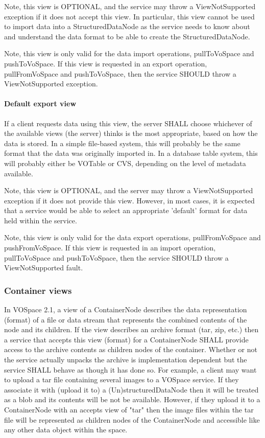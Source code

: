 \documentclass[11pt,a4paper]{ivoa}
\begin{document}
Note, this view is OPTIONAL, and the service may throw a ViewNotSupported exception if it does not accept this view. In particular, this view cannot be used to import data into a StructuredDataNode as the service needs to know about and understand the data format to be able to create the StructuredDataNode.

Note, this view is only valid for the data import operations, pullToVoSpace and pushToVoSpace. If this view is requested in an export operation, pullFromVoSpace and pushToVoSpace, then the service SHOULD throw a ViewNotSupported exception.

\paragraph{Default export view}
If a client requests data using this view, the server SHALL choose whichever of the available views (the server) thinks is the most appropriate, based on how the data is stored. In a simple file-based system, this will probably be the same format that the data was originally imported in. In a database table system, this will probably either be VOTable or CVS, depending on the level of metadata available.

Note, this view is OPTIONAL, and the server may throw a ViewNotSupported exception if it does not provide this view. However, in most cases, it is expected that a service would be able to select an appropriate 'default' format for data held within the service.

Note, this view is only valid for the data export operations, pullFromVoSpace and pushFromVoSpace. If this view is requested in an import operation, pullToVoSpace and pushToVoSpace, then the service SHOULD throw a ViewNotSupported fault.

\subsubsection{Container views}
In VOSpace 2.1, a view of a ContainerNode describes the data representation (format) of a file or data stream that represents the combined contents of the node and its children. If the view describes an archive format (tar, zip, etc.) then a service that accepts this view (format) for a ContainerNode SHALL provide access to the archive contents as children nodes of the container. Whether or not the service actually unpacks the archive is implementation dependent but the service SHALL behave as though it has done so. For example, a client may want to upload a tar file containing several images to a VOSpace service. If they associate it with (upload it to) a (Un)structuredDataNode then it will be treated as a blob and its contents will be not be available. However, if they upload it to a ContainerNode with an accepts view of "tar" then the image files within the tar file will be represented as children nodes of the ContainerNode and accessible like any other data object within the space.
\end{document}
